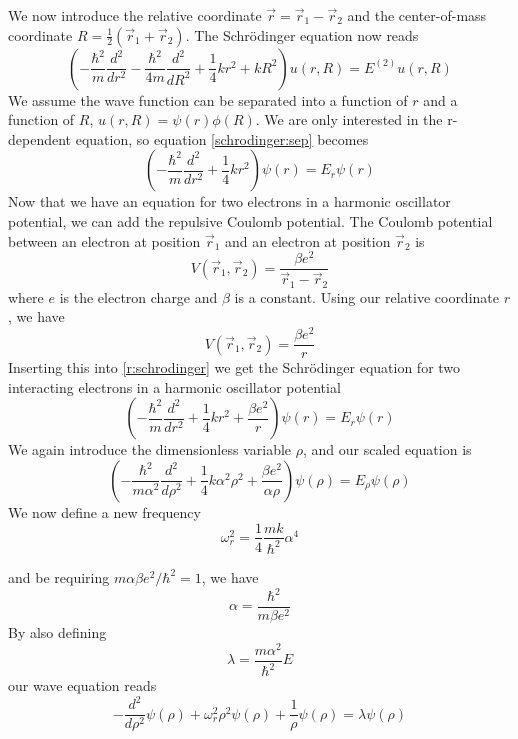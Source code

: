 \documentclass[12pt]{article}
\numberwithin{figure}{section}
\numberwithin{table}{section}
\begin{document}
\noindent We now introduce the relative coordinate $\vec{r}=\vec{r}_1-\vec{r}_2$ and the center-of-mass coordinate $R=\frac{1}{2}\left(\vec{r}_1+\vec{r}_2\right)$. The Schrödinger equation now reads
\begin{equation}
\label{schrodinger:sep}
\left(-\frac{\hbar^2}{m}\frac{d^2}{dr^2}-\frac{\hbar^2}{4m}\frac{d^2}{dR^2}+\frac{1}{4}kr^2+kR^2\right)u(r,R)=E^{(2)}u(r,R)
\end{equation}
We assume the wave function can be separated into a function of $r$ and a function of $R$, $u(r,R)=\psi(r)\phi(R)$. We are only interested in the r-dependent equation, so equation \eqref{schrodinger:sep} becomes 
\begin{equation}
\label{r:schrodinger}
\left(-\frac{\hbar^2}{m}\frac{d^2}{dr^2}+\frac{1}{4}kr^2\right)\psi(r)=E_r\psi(r)
\end{equation}
Now that we have an equation for two electrons in a harmonic oscillator potential, we can add the repulsive Coulomb potential. The Coulomb potential between an electron at position $\vec{r}_1$ and an electron at position $\vec{r}_2$ is 
$$V(\vec{r}_1,\vec{r}_2)=\frac{\beta e^2}{\vec{r}_1-\vec{r}_2}$$
where $e$ is the electron charge and $\beta$ is a constant. Using our relative coordinate $r$ , we have 
$$V(\vec{r}_1,\vec{r}_2)=\frac{\beta e^2}{r}$$
Inserting this into \eqref{r:schrodinger} we get the Schrödinger equation for two interacting electrons in a harmonic oscillator potential
\begin{equation}
\label{schrodinger:interacting}
\left(-\frac{\hbar^2}{m}\frac{d^2}{dr^2}+\frac{1}{4}kr^2+\frac{\beta e^2}{r}\right)\psi(r)=E_r\psi(r)
\end{equation}We again introduce the dimensionless variable $\rho$, and our scaled equation is
\begin{equation}
\label{schrodinger:interacting scaled}
\left(-\frac{\hbar^2}{m\alpha^2}\frac{d^2}{d\rho^2}+\frac{1}{4}k\alpha^2\rho^2+\frac{\beta e^2}{\alpha\rho}\right)\psi(\rho)=E_\rho\psi(\rho)
\end{equation}
We now define a new frequency
\begin{equation}
	\label{eq:omegar}
 \omega_r^2=\frac{1}{4}\frac{mk}{\hbar^2}\alpha^4
\end{equation}

\noindent and be requiring $m\alpha\beta e^2/\hbar^2=1$, we have 
$$\alpha = \frac{\hbar^2}{m\beta e^2}$$
By also defining
$$\lambda = \frac{m\alpha^2}{\hbar^2}E$$
our wave equation reads
\begin{equation}
\label{schrodinger:interacting final}
-\frac{d^2}{d\rho^2}\psi(\rho)+\omega^2_r\rho^2\psi(\rho)+\frac{1}{\rho}\psi(\rho)=\lambda\psi(\rho)
\end{equation}
\end{document}
